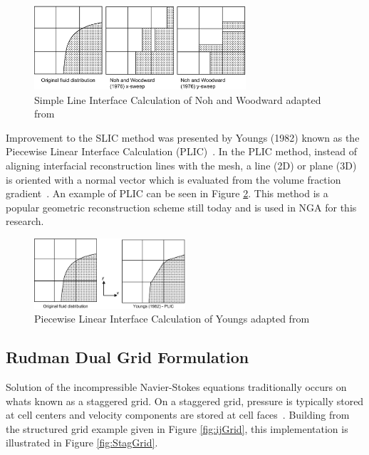 \begin{figure}[htbp]
	\centering
	\includegraphics[width=0.7\textwidth]{figs/SLIC.png}
	\caption{Simple Line Interface Calculation of Noh and Woodward adapted from \cite{SLICfig}}
	\label{fig:SLIC}
\end{figure}

Improvement to the SLIC method was presented by Youngs (1982)  known as the Piecewise Linear Interface Calculation (PLIC)~\cite{youngs}. In the PLIC method, instead of aligning interfacial reconstruction lines with the mesh, a line (2D) or plane (3D) is oriented with a normal vector which is evaluated from the volume fraction gradient~\cite{yeoh}. An example of PLIC can be seen in Figure \ref{fig:PLIC}. This method is a popular geometric reconstruction scheme still today and is used in NGA for this research.

\begin{figure}[htbp]
	\centering
	\includegraphics[width=0.5\textwidth]{figs/PLIC.png}
	\caption{Piecewise Linear Interface Calculation of Youngs adapted from \cite{yeoh}}
	\label{fig:PLIC}
\end{figure}

\subsection{Rudman Dual Grid Formulation}
Solution of the incompressible Navier-Stokes equations traditionally occurs on whats known as a staggered grid. On a staggered grid, pressure is typically stored at cell centers and velocity components are stored at cell faces~\cite{TRYG}. Building from the structured grid example given in Figure \ref{fig:ijGrid}, this implementation is illustrated in Figure \ref{fig:StagGrid}. 

